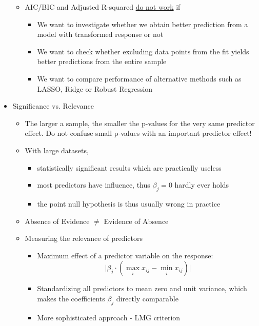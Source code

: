 \documentclass[a4paper]{article}
\begin{document}
\begin{itemize}
\begin{itemize}
        \item AIC/BIC and Adjusted R-squared \underline{do not work} if
        \begin{itemize}
            \item We want to investigate whether we obtain better prediction from a model with transformed response or not
            \item We want to check whether excluding data points from the fit yields better predictions from the entire sample
            \item We want to compare performance of alternative methods such as LASSO, Ridge or Robust Regression
        \end{itemize}
    \end{itemize}
    \item Significance vs. Relevance
    \begin{itemize}
        \item The larger a sample, the smaller the p-values for the very same predictor effect. Do not confuse small p-values with an important predictor effect!
        \item With large datasets,
        \begin{itemize}
            \item statistically significant results which are practically useless
            \item most predictors have influence, thus $\beta_j=0$ hardly ever holds
            \item the point null hypothesis is thus usually wrong in practice
        \end{itemize}
        \item Absence of Evidence $\neq$ Evidence of Absence
        \item Measuring the relevance of predictors
        \begin{itemize}
            \item Maximum effect of a predictor variable on the response:
            \[\lvert\beta_j\cdot(\max_ix_{ij}-\min_ix_{ij}) \rvert \]
            \item Standardizing all predictors to mean zero and unit variance, which makes the coefficients $\beta_j$ directly comparable
            \item More sophisticated approach - LMG criterion
        \end{itemize}
    \end{itemize}
\end{itemize}
\end{document}
